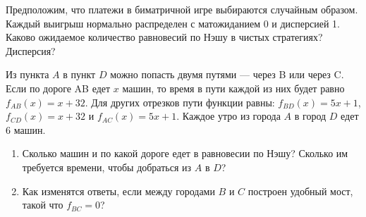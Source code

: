 
\begin{problem}
 Предположим, что платежи в биматричной игре выбираются случайным
образом. Каждый выигрыш нормально распределен с матожиданием 0 и
дисперсией 1. Каково ожидаемое количество равновесий по Нэшу в
чистых стратегиях? Дисперсия?



\begin{sol}

\end{sol}
\end{problem}




\begin{problem}[Мост]

Из пункта $A$ в пункт $D$ можно попасть двумя путями --- через B или
через C. Если по дороге AB едет $x$ машин, то время в пути каждой
из них будет равно $f_{AB}(x)=x+32$. Для других отрезков пути
функции равны: $f_{BD}(x)=5x+1$, $f_{CD}(x)=x+32$ и
$f_{AC}(x)=5x+1$.
Каждое утро из города $A$ в город $D$ едет 6 машин. \par
{}
\begin{enumerate}
\item Сколько машин и по какой дороге едет в равновесии по Нэшу?
Сколько им требуется времени, чтобы добраться из $A$ в $D$? \par
\item Как изменятся ответы, если между городами $B$ и $C$ построен
удобный мост, такой что $f_{BC}=0$?
\end{enumerate}


\begin{sol}

\end{sol}
\end{problem}



